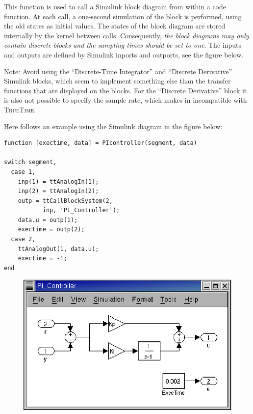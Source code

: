 \documentclass[final,twoside]{rapport}
\begin{document}
\descr This function is used to call a Simulink block diagram from
within a code function. At each call, a one-second simulation of the
block is performed, using the old states as initial values. The states
of the block diagram are stored internally by the kernel between
calls. Consequently, \emph{the block diagrams may only contain
  discrete blocks and the sampling times should be set to one}. The
inputs and outputs are defined by Simulink inports and outports, see
the figure below.

Note: Avoid using the ``Discrete-Time Integrator'' and ``Discrete
Derivative'' Simu\-link blocks, which seem to implement something else
than the transfer functions that are displayed on the blocks. For the
``Discrete Derivative'' block it is also not possible to specify the
sample rate, which makes in incompatible with \textsc{TrueTime}.


\example
Here follows an example using the Simulink diagram in the figure below:

\begin{small}
\begin{verbatim}
function [exectime, data] = PIcontroller(segment, data)

switch segment,
  case 1,
    inp(1) = ttAnalogIn(1);
    inp(2) = ttAnalogIn(2);
    outp = ttCallBlockSystem(2,
           inp, 'PI_Controller');
    data.u = outp(1);
    exectime = outp(2);
  case 2,
    ttAnalogOut(1, data.u);
    exectime = -1; 
end
\end{verbatim}
\end{small}

\vspace{-5.7cm}

\begin{figure}[h]
  \hspace{6.5cm}
  \includegraphics[scale=1]{block.ps}
\end{figure}
\end{document}
